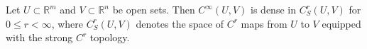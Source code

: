 Let $U \subset \mathbb{R}^m$ and $V \subset \mathbb{R}^n$ be open sets. Then $C^\infty(U, V)$ is dense in $C^r_S(U, V)$ for $0 \leqslant r < \infty$, where $C^r_S(U, V)$ denotes the space of $C^r$ maps from $U$ to $V$ equipped with the strong $C^r$ topology.
